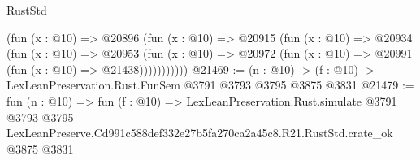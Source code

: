 \begin{lexlean}{RustStd}
\begin{coremodule}
            (fun (x : @10) =>
            @20896
              (fun (x : @10) =>
              @20915
                (fun (x : @10) =>
                @20934
                  (fun (x : @10) =>
                  @20953
                    (fun (x : @10) =>
                    @20972 (fun (x : @10) => @20991 (fun (x : @10) => @21438)))))))))))
@21469 := (n : @10) -> (f : @10) -> LexLeanPreservation.Rust.FunSem @3791 @3793 @3795 @3875 @3831
@21479 := fun (n : @10) =>
  fun (f : @10) =>
  LexLeanPreservation.Rust.simulate
    @3791
    @3793
    @3795
    LexLeanPreserve.Cd991c588def332e27b5fa270ca2a45c8.R21.RustStd.crate_ok
    @3875
    @3831
\end{coremodule}
\end{lexlean}
